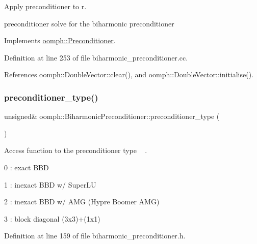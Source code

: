 Apply preconditioner to r. 

preconditioner solve for the biharmonic preconditioner 

Implements \hyperlink{classoomph_1_1Preconditioner_ace1199369e4465cd2b9a34884bb64ec8}{oomph\+::\+Preconditioner}.



Definition at line 253 of file biharmonic\+\_\+preconditioner.\+cc.



References oomph\+::\+Double\+Vector\+::clear(), and oomph\+::\+Double\+Vector\+::initialise().

\mbox{\label{classoomph_1_1BiharmonicPreconditioner_a6cbd786702f1faf6f9c3dca1b823e444}} 
\subsubsection{\texorpdfstring{preconditioner\+\_\+type()}{preconditioner\_type()}}
{\footnotesize\ttfamily unsigned\& oomph\+::\+Biharmonic\+Preconditioner\+::preconditioner\+\_\+type (\begin{DoxyParamCaption}{ }\end{DoxyParamCaption})\hspace{0.3cm}{\ttfamily [inline]}}



Access function to the preconditioner type ~\newline
. 


\begin{DoxyItemize}
\item 0 \+: exact B\+BD ~\newline

\item 1 \+: inexact B\+BD w/ Super\+LU ~\newline

\item 2 \+: inexact B\+BD w/ A\+MG (Hypre Boomer A\+MG)
\item 3 \+: block diagonal (3x3)+(1x1) 
\end{DoxyItemize}

Definition at line 159 of file biharmonic\+\_\+preconditioner.\+h.

